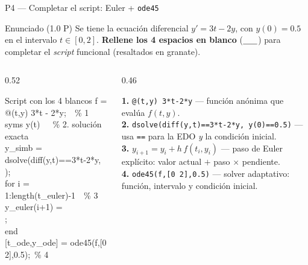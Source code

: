 \documentclass[aspectratio=169,10pt]{beamer}
\begin{document}
\begin{frame}{P4 — Completar el script: Euler + \texttt{ode45}}
\begin{cardidea}{Enunciado \textmd{\small(1.0 P)}}{\faQuestionCircle}
{\footnotesize Se tiene la ecuación diferencial $y'=3t-2y$, con $y(0)=0.5$ en el intervalo $t\in[0,2]$. \textbf{Rellene los 4 espacios en blanco} ($\underline{\hspace{6mm}}$) para completar el \emph{script} funcional (resaltados en granate).}
\end{cardidea}
\vspace{1mm}
\begin{columns}[T]
\begin{column}{0.52\textwidth}
\begin{cardgear}{Script con los 4 blancos}{\faCode}
{\scriptsize\ttfamily
f = {\color{Granate}@(t,y) 3*t - 2*y};\ \ \% 1\\[0.5mm]
syms y(t)\ \ \ \% 2. solución exacta\\
y\_simb = dsolve({\color{Granate}diff(y,t)==3*t-2*y,}\\
);\\[0.5mm]
for i = 1:length(t\_euler)-1\ \ \% 3\\
\hphantom{yy}y\_euler(i+1) = \\
;\\
end\\[0.5mm]
[t\_ode,y\_ode] = ode45({\color{Granate}f,[0 2],0.5});\ \% 4
}
\end{cardgear}
\end{column}
\begin{column}{0.46\textwidth}
\begin{cardnota}[\faListOl]
{\footnotesize
\textbf{1.} \texttt{@(t,y) 3*t-2*y} — función anónima que evalúa $f(t,y)$.\\[0.8mm]
\textbf{2.} \texttt{dsolve(diff(y,t)==3*t-2*y, y(0)==0.5)} — usa \texttt{==} para la EDO \emph{y} la condición inicial.\\[0.8mm]
\textbf{3.} $y_{i+1}=y_i+h\,f(t_i,y_i)$ — paso de Euler explícito: valor actual $+$ paso $\times$ pendiente.\\[0.8mm]
\textbf{4.} \texttt{ode45(f,[0 2],0.5)} — solver adaptativo: función, intervalo y condición inicial.}
\end{cardnota}
\end{column}
\end{columns}
\end{frame}
\end{document}
